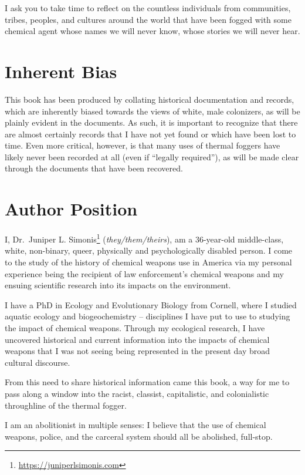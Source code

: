\documentclass[
  11pt,
]{krantz}
\renewcommand{\href}[2]{#2\footnote{\url{#1}}}
\begin{document}
I ask you to take time to reflect on the countless individuals from communities, tribes, peoples, and cultures around the world that have been fogged with some chemical agent whose names we will never know, whose stories we will never hear.

\hypertarget{inherent-bias}{%
\section*{Inherent Bias}\label{inherent-bias}}


This book has been produced by collating historical documentation and records, which are inherently biased towards the views of white, male colonizers, as will be plainly evident in the documents.
As such, it is important to recognize that there are almost certainly records that I have not yet found or which have been lost to time.
Even more critical, however, is that many uses of thermal foggers have likely never been recorded at all (even if ``legally required''), as will be made clear through the documents that have been recovered.

\hypertarget{author-position}{%
\section*{Author Position}\label{author-position}}


I, \href{https://juniperlsimonis.com}{Dr.~Juniper L. Simonis} (\emph{they/them/theirs}), am a 36-year-old middle-class, white, non-binary, queer, physically and psychologically disabled person.
I come to the study of the history of chemical weapons use in America via my personal experience being the recipient of law enforcement's chemical weapons and my ensuing scientific research into its impacts on the environment.

I have a PhD in Ecology and Evolutionary Biology from Cornell, where I studied aquatic ecology and biogeochemistry -- disciplines I have put to use to studying the impact of chemical weapons.
Through my ecological research, I have uncovered historical and current information into the impacts of chemical weapons that I was not seeing being represented in the present day broad cultural discourse.

From this need to share historical information came this book, a way for me to pass along a window into the racist, classist, capitalistic, and colonialistic throughline of the thermal fogger.

I am an abolitionist in multiple senses: I believe that the use of chemical weapons, police, and the carceral system should all be abolished, full-stop.
\end{document}

